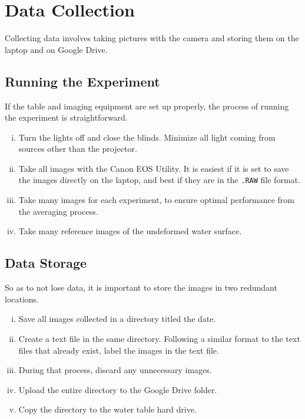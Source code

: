 \documentclass[11pt]{article}
\begin{document}
\section*{Data Collection}

Collecting data involves taking pictures with the camera and storing them on the laptop and on Google Drive.

\subsection*{Running the Experiment}

If the table and imaging equipment are set up properly, the process of running the experiment is straightforward.

\begin{enumerate}[(i)]
    \item Turn the lights off and close the blinds. Minimize all light coming from sources other than the projector.

    \item Take all images with the Canon EOS Utility. It is easiest if it is set to save the images directly on the laptop, and best if they are in the {\tt .RAW} file format.

    \item Take many images for each experiment, to ensure optimal performance from the averaging process.

    \item Take many reference images of the undeformed water surface.
\end{enumerate}

\subsection*{Data Storage}

So as to not lose data, it is important to store the images in two redundant locations.

\begin{enumerate}[(i)]
    \item Save all images collected in a directory titled the date.

    \item Create a text file in the same directory. Following a similar format to the text files that already exist, label the images in the text file.

    \item During that process, discard any unnecessary images.

    \item Upload the entire directory to the Google Drive folder.

    \item Copy the directory to the water table hard drive.
\end{enumerate}
\end{document}
